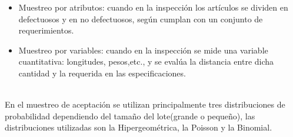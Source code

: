 \begin{itemize}
\item Muestreo por atributos: cuando en la inspecci\'{o}n los art\'{i}culos se dividen en defectuosos y en no defectuosos, seg\'{u}n cumplan con un conjunto de requerimientos.
\item Muestreo por variables: cuando en la inspecci\'{o}n se mide una variable cuantitativa: longitudes, pesos,etc., y se eval\'{u}a la distancia entre dicha cantidad y la requerida en las especificaciones.
\end{itemize}

~\\En el muestreo de aceptaci\'{o}n se utilizan principalmente tres distribuciones de probabilidad dependiendo del tama\~{n}o del lote(grande o peque\~{n}o), las distribuciones utilizadas son la Hipergeom\'{e}trica, la Poisson y la Binomial.

